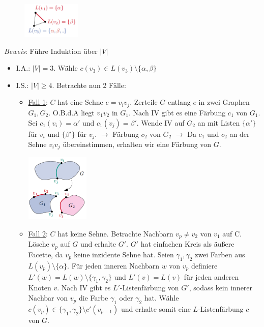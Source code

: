 \begin{figure}
	\centering
	\vspace{-30pt}
	\includegraphics[width=0.25\textwidth]{images/thom-1.png}
	\vspace{40pt}
	\vspace{-120pt}
\end{figure}
\textit{Beweis}: Führe Induktion über $|V|$
\begin{itemize}
	\item I.A.: $|V|=3$. Wähle $c(v_3)\in L(v_3)\setminus\{\alpha,\beta\}$
	\item I.S.: $|V|\geq 4$. Betrachte nun 2 Fälle:
	\begin{itemize}
		\item \underline{Fall 1}: $C$ hat eine Sehne $e=v_iv_j$.
		Zerteile $G$ entlang $e$ in zwei Graphen $G_1,G_2$.
		O.B.d.A liegt $v_1v_2$ in $G_1$. 
		Nach IV gibt es eine Färbung $c_1$ von $G_1$.
		Sei $c_1(v_i)=\alpha'$ und $c_1(v_j)=\beta'$.
		Wende IV auf $G_2$ an mit Listen $\{\alpha'\}$ für $v_i$ und $\{\beta'\}$ für $v_j$. 
		$\rightarrow$ Färbung $c_2$ von $G_2$
		$\rightarrow$ Da $c_1$ und $c_2$ an der Sehne $v_iv_j$ übereinstimmen, erhalten wir eine Färbung von $G$.
		\begin{center}
			\includegraphics[width=0.25\textwidth]{images/thom-2.png}
		\end{center}
		\item \underline{Fall 2}: $C$ hat keine Sehne.
		Betrachte Nachbarn $v_p\neq v_2$ von $v_1$ auf C. Lösche $v_p$ auf $G$ und erhalte $G'$. $G'$ hat einfachen Kreis als äußere Facette, da $v_p$
		keine inzidente Sehne hat. Seien $\gamma_1,\gamma_2$ zwei Farben aus $L(v_p)\setminus\{\alpha\}$. Für jeden inneren Nachbarn $w$ von $v_p$ definiere $L'(w)=L(w)\setminus\{\gamma_1,\gamma_2\}$ und $L'(v)=L(v)$ für jeden anderen Knoten $v$. Nach IV gibt es $L'$-Listenfärbung von $G'$, sodass kein innerer Nachbar von $v_p$ die Farbe $\gamma_1$ oder $\gamma_2$ hat. Wähle $c(v_p)\in\{\gamma_1,\gamma_2\}\setminus c'(v_{p-1})$ und erhalte somit eine $L$-Listenfärbung $c$ von $G$.

\end{itemize}
\end{itemize}
